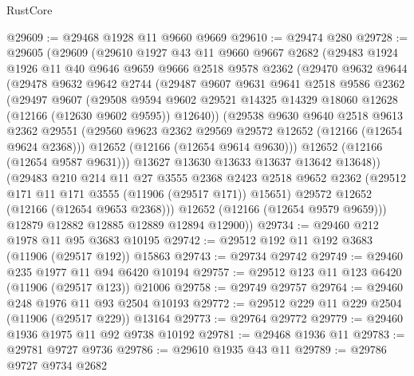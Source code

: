 \begin{lexlean}{RustCore}
\begin{coremodule}
@29609 := @29468 @1928 @11 @9660 @9669
@29610 := @29474 @280
@29728 := @29605
    (@29609
      (@29610
        @1927
        @43
        @11
        @9660
        @9667
        @2682
        (@29483
          @1924
          @1926
          @11
          @40
          @9646
          @9659
          @9666
          @2518
          @9578
          @2362
          (@29470
            @9632
            @9644
            (@29478
              @9632
              @9642
              @2744
              (@29487
                @9607
                @9631
                @9641
                @2518
                @9586
                @2362
                (@29497
                  @9607
                  (@29508
                    @9594
                    @9602
                    @29521
                    @14325
                    @14329
                    @18060
                    @12628
                    (@12166 (@12630 @9602 @9595))
                    @12640))
                (@29538
                  @9630
                  @9640
                  @2518
                  @9613
                  @2362
                  @29551
                  (@29560 @9623 @2362 @29569 @29572 @12652 (@12166 (@12654 @9624 @2368)))
                  @12652
                  (@12166 (@12654 @9614 @9630)))
                @12652
                (@12166 (@12654 @9587 @9631)))
              @13627
              @13630
              @13633
              @13637
              @13642
              @13648))
          (@29483
            @210
            @214
            @11
            @27
            @3555
            @2368
            @2423
            @2518
            @9652
            @2362
            (@29512 @171 @11 @171 @3555 (@11906 (@29517 @171)) @15651)
            @29572
            @12652
            (@12166 (@12654 @9653 @2368)))
          @12652
          (@12166 (@12654 @9579 @9659)))
        @12879
        @12882
        @12885
        @12889
        @12894
        @12900))
@29734 := @29460 @212 @1978 @11 @95 @3683 @10195
@29742 := @29512 @192 @11 @192 @3683 (@11906 (@29517 @192)) @15863
@29743 := @29734 @29742
@29749 := @29460 @235 @1977 @11 @94 @6420 @10194
@29757 := @29512 @123 @11 @123 @6420 (@11906 (@29517 @123)) @21006
@29758 := @29749 @29757
@29764 := @29460 @248 @1976 @11 @93 @2504 @10193
@29772 := @29512 @229 @11 @229 @2504 (@11906 (@29517 @229)) @13164
@29773 := @29764 @29772
@29779 := @29460 @1936 @1975 @11 @92 @9738 @10192
@29781 := @29468 @1936 @11
@29783 := @29781 @9727 @9736
@29786 := @29610 @1935 @43 @11
@29789 := @29786 @9727 @9734 @2682

\end{coremodule}
\end{lexlean}
